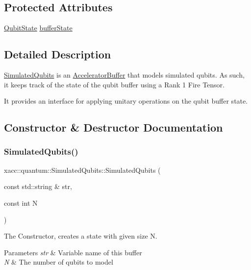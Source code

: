 \subsection*{Protected Attributes}
\begin{DoxyCompactItemize}
\item 
\hyperlink{a01445}{Qubit\+State} \hyperlink{a01345_a630bea50ee06fd59f74450f01f95e489}{buffer\+State}
\end{DoxyCompactItemize}


\subsection{Detailed Description}
\hyperlink{a01345}{Simulated\+Qubits} is an \hyperlink{a01625}{Accelerator\+Buffer} that models simulated qubits. As such, it keeps track of the state of the qubit buffer using a Rank 1 Fire Tensor.

It provides an interface for applying unitary operations on the qubit buffer state. 

\subsection{Constructor \& Destructor Documentation}
\mbox{\label{a01345_abb0419229628210a1c187b76be6edc30}} 
\subsubsection{\texorpdfstring{Simulated\+Qubits()}{SimulatedQubits()}\hspace{0.1cm}{\footnotesize\ttfamily [1/2]}}
{\footnotesize\ttfamily xacc\+::quantum\+::\+Simulated\+Qubits\+::\+Simulated\+Qubits (\begin{DoxyParamCaption}\item[{const std\+::string \&}]{str,  }\item[{const int}]{N }\end{DoxyParamCaption})\hspace{0.3cm}{\ttfamily [inline]}}

The Constructor, creates a state with given size N. 
\begin{DoxyParams}{Parameters}
{\em str} & Variable name of this buffer \\
\hline
{\em N} & The number of qubits to model \\
\hline
\end{DoxyParams}
\mbox{\label{a01345_a812afe5bad306acfe2b46e05098040a4}} 
